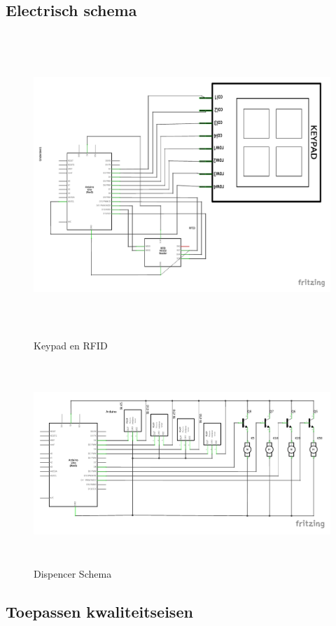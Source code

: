 \documentclass{article}
\begin{document}
\subsection{Electrisch schema}
\begin{figure}[H]
       \centering
       \includegraphics[height=4.5in]{Input_schema.pdf}
       \caption{Keypad en RFID}
       \label{fig: Keypad en RFID}
\end{figure}

\begin{figure}[H]
	\centering
	\includegraphics[height=3.0in]{Dispenser_schema.pdf}
	\caption{Dispencer Schema}
	\label{fig: Dispencer Schema}
\end{figure}

\subsection{Toepassen kwaliteitseisen}
\end{document}
